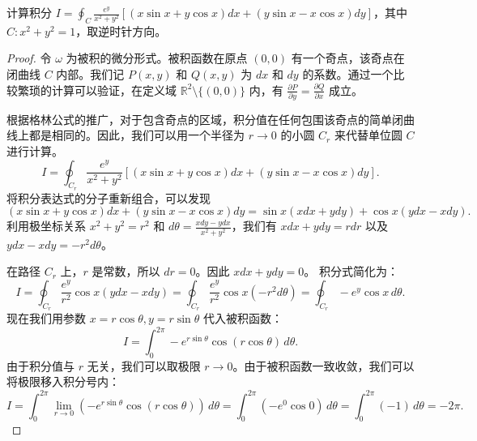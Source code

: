 \documentclass[lang=cn,10pt,thmcnt=section]{elegantbook}
\begin{document}
\begin{example}
    计算积分 $I = \oint_{C} \frac{e^y}{x^2 + y^2} \left[ (x \sin x + y \cos x) dx + (y \sin x - x \cos x) dy \right]$，其中 $C: x^2 + y^2 = 1$，取逆时针方向。
\end{example}
\begin{proof}
    令 $\omega$ 为被积的微分形式。被积函数在原点 $(0,0)$ 有一个奇点，该奇点在闭曲线 $C$ 内部。我们记 $P(x,y)$ 和 $Q(x,y)$ 为 $dx$ 和 $dy$ 的系数。通过一个比较繁琐的计算可以验证，在定义域 $\mathbb{R}^2 \setminus \{(0,0)\}$ 内，有 $\frac{\partial P}{\partial y} = \frac{\partial Q}{\partial x}$ 成立。

    根据格林公式的推广，对于包含奇点的区域，积分值在任何包围该奇点的简单闭曲线上都是相同的。因此，我们可以用一个半径为 $r \to 0$ 的小圆 $C_r$ 来代替单位圆 $C$ 进行计算。
    \[
    I = \oint_{C_r} \frac{e^y}{x^2 + y^2} \left[ (x \sin x + y \cos x) dx + (y \sin x - x \cos x) dy \right].
    \]
    将积分表达式的分子重新组合，可以发现
    \[
    (x \sin x + y \cos x) dx + (y \sin x - x \cos x) dy = \sin x (x dx + y dy) + \cos x (y dx - x dy).
    \]
    利用极坐标关系 $x^2+y^2=r^2$ 和 $d\theta = \frac{x dy - y dx}{x^2+y^2}$，我们有 $x dx + y dy = r dr$ 以及 $y dx - x dy = -r^2 d\theta$。
    
    在路径 $C_r$ 上，$r$ 是常数，所以 $dr=0$。因此 $x dx + y dy = 0$。
    积分式简化为：
    \[
    I = \oint_{C_r} \frac{e^y}{r^2} \cos x (y dx - x dy) = \oint_{C_r} \frac{e^y}{r^2} \cos x (-r^2 d\theta) = \oint_{C_r} -e^y \cos x \, d\theta.
    \]
    现在我们用参数 $x=r\cos\theta, y=r\sin\theta$ 代入被积函数：
    \[
    I = \int_0^{2\pi} -e^{r\sin\theta} \cos(r\cos\theta) \, d\theta.
    \]
    由于积分值与 $r$ 无关，我们可以取极限 $r \to 0$。由于被积函数一致收敛，我们可以将极限移入积分号内：
    \[
    I = \int_0^{2\pi} \lim_{r \to 0} \left( -e^{r\sin\theta} \cos(r\cos\theta) \right) \, d\theta = \int_0^{2\pi} (-e^0 \cos 0) \, d\theta = \int_0^{2\pi} (-1) \, d\theta = -2\pi.
    \]
\end{proof}
\end{document}
